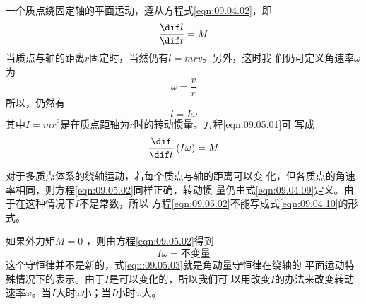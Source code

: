 \documentclass[../outline-of-mechanics.tex]{subfiles}
\begin{document}
\section[转动动能]{}\label{sec:09.05}

一个质点绕固定轴的平面运动，遵从方程式\eqref{eqn:09.04.02}，即
\begin{equation}\label{eqn:09.05.01}
  \frac { \dif l } { \dif t } = M
\end{equation}
当质点与轴的距离$ r $固定时，当然仍有$ l = m r v $。另外，这时我
们仍可定义角速率$ \omega $为
\begin{equation*}
  \omega = \frac { v } { r }
\end{equation*}
所以，仍然有
\begin{equation*}
  l = I \omega
\end{equation*}
其中$ I = m r ^ { 2 } $是在质点距轴为$ r $时的转动惯量。方程\eqref{eqn:09.05.01}可
写成
\begin{equation}\label{eqn:09.05.02}
  \frac { \dif } { \dif t } \left( I \omega \right) = M
\end{equation}

对于多质点体系的绕轴运动，若每个质点与轴的距离可以变
化，但各质点的角速率相同，则方程\eqref{eqn:09.05.02}同样正确，转动惯
量仍由式\eqref{eqn:09.04.09}定义。由于在这种情况下$ I $不是常数，所以
方程\eqref{eqn:09.05.02}不能写成式\eqref{eqn:09.04.10}的形式。

如果外力矩$ M = 0 $ ，则由方程\eqref{eqn:09.05.02}得到
\begin{equation}\label{eqn:09.05.03}
  I \omega = \text{不变量}
\end{equation}
这个守恒律并不是新的，式\eqref{eqn:09.05.03}就是角动量守恒律在绕轴的
平面运动特殊情况下的表示。由于$ I $是可以变化的，所以我们可
以用改变$ I $的办法来改变转动速率$ \omega $。当$ I $大时$ \omega $小；当$ I $小时$ \omega $大。
\end{document}
